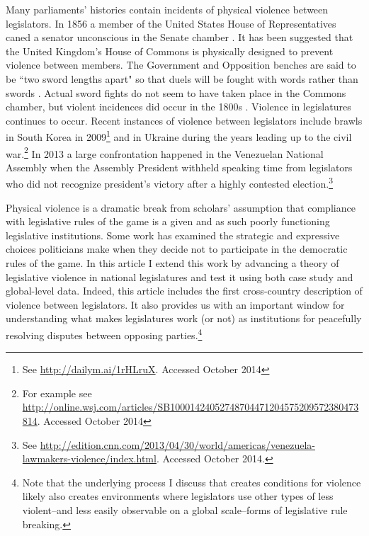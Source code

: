 \documentclass[a4paper]{article}\usepackage[]{graphicx}\usepackage[]{color}
\begin{document}
Many parliaments' histories contain incidents of physical violence between legislators. In 1856 a member of the United States House of Representatives caned a senator unconscious in the Senate chamber \citep{USSenateCanning}. It has been suggested that the United Kingdom's House of Commons is physically designed to prevent violence between members. The Government and Opposition benches are said to be ``two sword lengths apart" \citep{ParliamentUKSword} so that duels will be fought with words rather than swords \cite[220]{Schwarzmantel2010}. Actual sword fights do not seem to have taken place in the Commons chamber, but violent incidences did occur in the 1800s \citep[]{ByrneViolence}. Violence in legislatures continues to occur. Recent instances of violence between legislators include brawls in South Korea in 2009\footnote{See \url{http://dailym.ai/1rHLruX}. Accessed October 2014} and in Ukraine during the years leading up to the civil war.\footnote{For example see \url{http://online.wsj.com/articles/SB10001424052748704471204575209572380473814}. Accessed October 2014} In 2013 a large confrontation happened in the Venezuelan National Assembly when the Assembly President withheld speaking time from legislators who did not recognize president's victory after a highly contested election.\footnote{See \url{http://edition.cnn.com/2013/04/30/world/americas/venezuela-lawmakers-violence/index.html}. Accessed October 2014.}

Physical violence is a dramatic break from scholars' assumption that compliance with legislative rules of the game is a given and as such  poorly functioning  legislative institutions. Some work has examined the strategic and expressive choices politicians make when they decide not to participate in the democratic rules of the game\citep{wilkinson2006,Beaulieu2008,BeaulieuForthcoming}. In this article I extend this work by advancing a theory of legislative violence in  national legislatures and test it using both case study and global-level data. Indeed, this article includes the first cross-country description of violence between legislators. It also provides us with an important window for understanding what makes legislatures work (or not) as institutions for peacefully resolving disputes between opposing parties.\footnote{Note that the underlying process I discuss that creates conditions for violence likely also creates environments where legislators use other types of less violent--and less easily observable on a global scale--forms of legislative rule breaking.}
\end{document}
